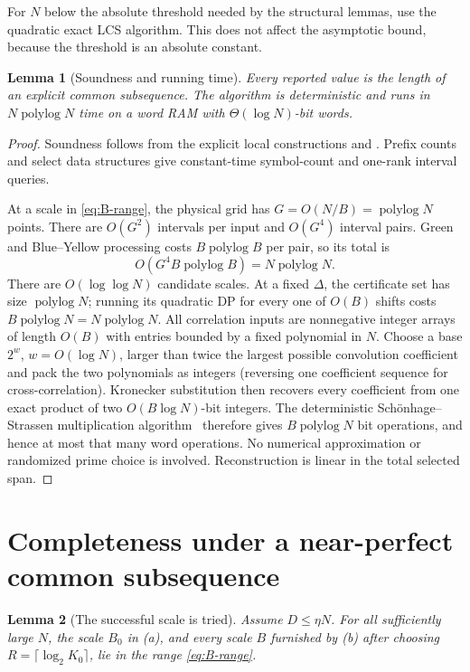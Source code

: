 \documentclass[11pt]{article}
\newtheorem{lemma}[lemma]{Lemma}
\theoremstyle{remark}
\newcommand{\polylog}{\operatorname{polylog}}
\begin{document}
For $N$ below the absolute threshold needed by the structural lemmas, use the
quadratic exact LCS algorithm.  This does not affect the asymptotic bound,
because the threshold is an absolute constant.

\begin{lemma}[Soundness and running time]\label{lem:runtime}
Every reported value is the length of an explicit common subsequence.  The
algorithm is deterministic and runs in $N\polylog N$ time on a word RAM with
$\Theta(\log N)$-bit words.
\end{lemma}

\begin{proof}
Soundness follows from the explicit local constructions and
.  Prefix counts and select data structures give constant-time
symbol-count and one-rank interval queries.

At a scale in \eqref{eq:B-range}, the physical grid has
$G=O(N/B)=\polylog N$ points.  There are $O(G^2)$ intervals per input and
$O(G^4)$ interval pairs.  Green and Blue--Yellow processing costs
$B\polylog B$ per pair, so its total is
\[
 O(G^4B\polylog B)=N\polylog N.
\]
There are $O(\log\log N)$ candidate scales.  At a fixed $\Delta$, the
certificate set has size $\polylog N$; running its quadratic DP for every one
of $O(B)$ shifts costs $B\polylog N=N\polylog N$.  All correlation inputs
are nonnegative integer arrays of length $O(B)$ with entries bounded by a
fixed polynomial in $N$.  Choose a base $2^w$, $w=O(\log N)$, larger than
twice the largest possible convolution coefficient and pack the two
polynomials as integers (reversing one coefficient sequence for
cross-correlation).  Kronecker substitution then recovers every coefficient
from one exact product of two $O(B\log N)$-bit integers.  The deterministic
Sch\"onhage--Strassen multiplication algorithm~\cite{SchonhageStrassen}
therefore gives $B\polylog N$ bit operations, and hence at most that many
word operations.  No numerical approximation or randomized prime choice is
involved.  Reconstruction is linear in the total selected span.
\end{proof}

\section{Completeness under a near-perfect common subsequence}
\label{sec:balanced-completeness}

\begin{lemma}[The successful scale is tried]\label{lem:scale-tried}
Assume $D\le\eta N$.  For all sufficiently large $N$, the scale $B_0$ in
(a), and every scale $B$ furnished by
(b) after choosing
$R=\lceil\log_2K_0\rceil$, lie in the range \eqref{eq:B-range}.
\end{lemma}
\end{document}

